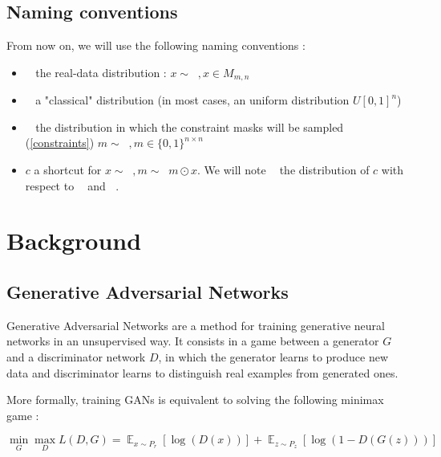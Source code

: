 \documentclass{article}
\begin{document}
	\subsection{Naming conventions}
	
		From now on, we will use the following naming conventions :
		
		\begin{itemize}
			
			\item $\mathop{\mathbb{{P}}_{r}}$ the real-data distribution : $x\sim \mathop{\mathbb{{P}}_{r}}, x\in M_{m, n}$
			
			\item $\mathop{\mathbb{{P}}_{z}}$ a "classical" distribution (in most cases, an uniform distribution $U[0,1]^n$)
			
			\item $\mathop{\mathbb{{P}}_{m}}$ the distribution in which the constraint masks will be sampled (\ref{constraints}) $m \sim 
			\mathop{\mathbb{{P}}_{m}},  m \in \{0, 1\}^{n\times n}$
			
			\item $c$ a shortcut for $x\sim \mathop{\mathbb{{P}}_{r}},	m \sim \mathop{\mathbb{{P}}_{m} } m\odot x$. We will note $ \mathop{\mathbb{{P}}_{c} }$ the distribution of  $c$ with respect to $\mathop{\mathbb{{P}}_{r}}$ and $ \mathop{\mathbb{{P}}_{m} }$.
			
		\end{itemize}

\section{Background}

	\subsection{Generative Adversarial Networks}
	
		Generative Adversarial Networks\cite{goodfellow14} are a method for training generative neural networks in an unsupervised way. It consists in a game between a generator $G$ and a discriminator network $D$, in which the generator learns to produce new data and discriminator learns to distinguish real examples from generated ones.
		
		More formally, training GANs is equivalent to solving the following minimax game :
		
		\begin{equation}
			\min_G \max_D L(D, G) = \mathop{\mathbb{E}}_{x\sim P_r} [\log (D(x))] + \mathop{\mathbb{E}}_{z\sim P_z} [\log (1-D(G(z)))]
		\end{equation}
		
\end{document}
